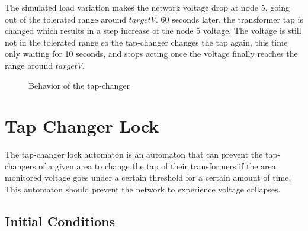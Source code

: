 \documentclass[a4paper, 12pt]{report}
\begin{document}
The simulated load variation makes the network voltage drop at node 5, going out of the tolerated range around $targetV$. 60 seconds later, the transformer tap is changed which results in a step increase of the node 5 voltage. The voltage is still not in the tolerated range so the tap-changer changes the tap again, this time only waiting for 10 seconds, and stops acting once the voltage finally reaches the range around $targetV$.

\begin{figure}[H]
\caption{Behavior of the tap-changer}
\end{figure}

\newpage
\section{Tap Changer Lock}
\label{TapChangerBlockingAutomaton}

The tap-changer lock automaton is an automaton that can prevent the tap-changers of a given area to change the tap of their transformers if the area monitored voltage  goes under a certain threshold for a certain amount of time. This automaton should prevent the network to experience voltage collapses.

\subsection{Initial Conditions}
\end{document}
